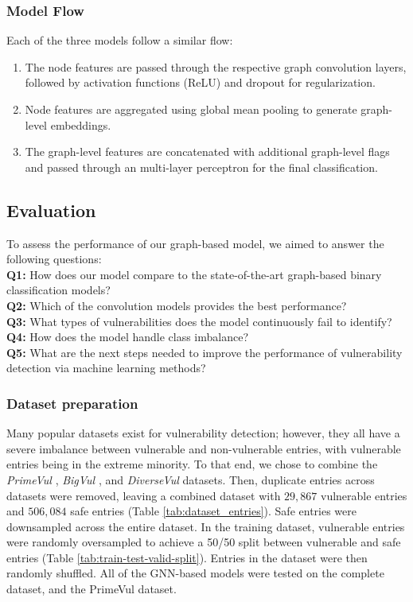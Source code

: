 \documentclass{article}
\begin{document}
\begin{description}
\end{description}

\subsubsection{Model Flow}
Each of the three models follow a similar flow:
\begin{enumerate}
    \item The node features are passed through the respective graph convolution layers, followed by activation functions (ReLU) and dropout for regularization.
    \item Node features are aggregated using global mean pooling to generate graph-level embeddings.
    \item The graph-level features are concatenated with additional graph-level flags and passed through an multi-layer perceptron for the final classification.
\end{enumerate}

\subsection{Evaluation}
To assess the performance of our graph-based model, we aimed to answer the following questions: \\
\textbf{Q1: } How does our model compare to the state-of-the-art graph-based binary classification models? \\
\textbf{Q2: } Which of the convolution models provides the best performance? \\
\textbf{Q3: } What types of vulnerabilities does the model continuously fail to identify? \\
\textbf{Q4: } How does the model handle class imbalance? \\
\textbf{Q5: } What are the next steps needed to improve the performance of vulnerability detection via machine learning methods?

\subsubsection{Dataset preparation}
Many popular datasets exist for vulnerability detection; however, they all have a severe imbalance between vulnerable and non-vulnerable entries, with vulnerable entries being in the extreme minority. To that end, we chose to combine the \textit{PrimeVul} \cite{primevul}, \textit{BigVul} \cite{bigvul}, and \textit{DiverseVul} \cite{diversevul} datasets. Then, duplicate entries across datasets were removed, leaving a combined dataset with $29,867$ vulnerable entries and $506,084$ safe entries (Table \ref{tab:dataset_entries}). Safe entries were downsampled across the entire dataset. In the training dataset, vulnerable entries were randomly oversampled to achieve a 50/50 split between vulnerable and safe entries (Table \ref{tab:train-test-valid-split}). Entries in the dataset were then randomly shuffled. All of the GNN-based models were tested on the complete dataset, and the PrimeVul dataset.
\end{document}
